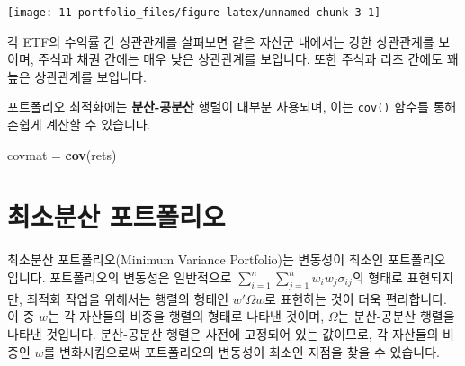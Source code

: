 \documentclass[12pt,]{book}
\newenvironment{Shaded}{\begin{snugshade}}{\end{snugshade}}
\newcommand{\DataTypeTok}[1]{\textcolor[rgb]{0.13,0.29,0.53}{#1}}
\newcommand{\DecValTok}[1]{\textcolor[rgb]{0.00,0.00,0.81}{#1}}
\newcommand{\FloatTok}[1]{\textcolor[rgb]{0.00,0.00,0.81}{#1}}
\newcommand{\KeywordTok}[1]{\textcolor[rgb]{0.13,0.29,0.53}{\textbf{#1}}}
\newcommand{\NormalTok}[1]{#1}
\newcommand{\OperatorTok}[1]{\textcolor[rgb]{0.81,0.36,0.00}{\textbf{#1}}}
\newcommand{\StringTok}[1]{\textcolor[rgb]{0.31,0.60,0.02}{#1}}
\begin{document}
\begin{Shaded}
\end{Shaded}

\begin{center}\texttt{[image: 11-portfolio\_files/figure-latex/unnamed-chunk-3-1]} \end{center}

각 ETF의 수익률 간 상관관계를 살펴보면 같은 자산군 내에서는 강한 상관관계를 보이며, 주식과 채권 간에는 매우 낮은 상관관계를 보입니다. 또한 주식과 리츠 간에도 꽤 높은 상관관계를 보입니다.

포트폴리오 최적화에는 \textbf{분산-공분산} 행렬이 대부분 사용되며, 이는 \texttt{cov()} 함수를 통해 손쉽게 계산할 수 있습니다.

\begin{Shaded}
\begin{Highlighting}[]
\NormalTok{covmat =}\StringTok{ }\KeywordTok{cov}\NormalTok{(rets)}
\end{Highlighting}
\end{Shaded}

\hypertarget{section-69}{%
\section{최소분산 포트폴리오}\label{section-69}}

최소분산 포트폴리오(Minimum Variance Portfolio)는 변동성이 최소인 포트폴리오 입니다. 포트폴리오의 변동성은 일반적으로 \(\sum_{i=1}^{n}\sum_{j=1}^{n}w_iw_j\sigma_{ij}\)의 형태로 표현되지만, 최적화 작업을 위해서는 행렬의 형태인 \(w'\Omega w\)로 표현하는 것이 더욱 편리합니다. 이 중 \(w\)는 각 자산들의 비중을 행렬의 형태로 나타낸 것이며, \(\Omega\)는 분산-공분산 행렬을 나타낸 것입니다. 분산-공분산 행렬은 사전에 고정되어 있는 값이므로, 각 자산들의 비중인 \(w\)를 변화시킴으로써 포트폴리오의 변동성이 최소인 지점을 찾을 수 있습니다.
\end{document}
